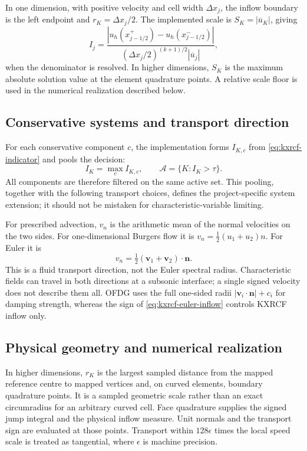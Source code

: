 In one dimension, with positive velocity and cell width $\Delta x_j$, the
inflow boundary is the left endpoint and $r_K=\Delta x_j/2$. The implemented
scale is $S_K=|\overline u_K|$, giving
\begin{equation}
 I_j=\frac{|u_h(x_{j-1/2}^{+})-u_h(x_{j-1/2}^{-})|}
                 {(\Delta x_j/2)^{(k+1)/2}|\overline u_j|},
 \label{eq:kxrcf-1d}
\end{equation}
when the denominator is resolved. In higher dimensions, $S_K$ is the maximum
absolute solution value at the element quadrature points. A relative scale
floor is used in the numerical realization described below.

\subsection{Conservative systems and transport direction}
For each conservative component $c$, the implementation forms $I_{K,c}$ from
\cref{eq:kxrcf-indicator} and pools the decision:
\begin{equation}
 I_K=\max_c I_{K,c},\qquad
 \mathcal A=\{K:I_K>\tau\}.
 \label{eq:kxrcf-components}
\end{equation}
All components are therefore filtered on the same active set. This pooling,
together with the following transport choices, defines the project-specific
system extension; it should not be mistaken for characteristic-variable
limiting.

For prescribed advection, $v_n$ is the arithmetic mean of the normal velocities
on the two sides. For one-dimensional Burgers flow it is
$v_n=\tfrac12(u_1+u_2)n$. For Euler it is
\begin{equation}
 v_n=\tfrac12(\boldsymbol v_1+\boldsymbol v_2)\cdot\boldsymbol n.
 \label{eq:kxrcf-euler-inflow}
\end{equation}
This is a fluid transport direction, not the Euler spectral radius.
Characteristic fields can travel in both directions at a subsonic interface;
a single signed velocity does not describe them all. OFDG uses the full
one-sided radii $|\boldsymbol v_i\cdot\boldsymbol n|+c_i$ for damping strength,
whereas the sign of \cref{eq:kxrcf-euler-inflow} controls KXRCF inflow only.

\subsection{Physical geometry and numerical realization}
In higher dimensions, $r_K$ is the largest sampled distance from the mapped
reference centre to mapped vertices and, on curved elements, boundary
quadrature points. It is a sampled geometric scale rather than an exact
circumradius for an arbitrary curved cell. Face quadrature supplies the signed
jump integral and the physical inflow measure. Unit normals and the transport
sign are evaluated at those points. Transport within $128\epsilon$ times the
local speed scale is treated as tangential, where $\epsilon$ is machine
precision.

